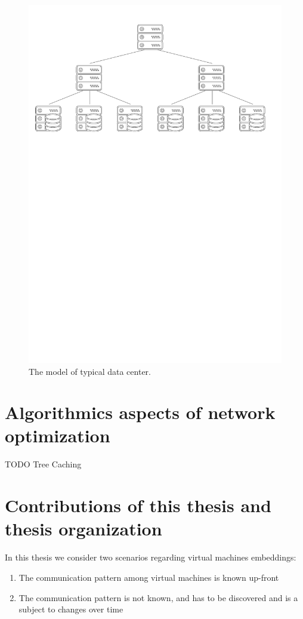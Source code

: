 \begin{figure}[t]
\centering
\includegraphics[width=0.79\columnwidth]{figs/tree-topology.pdf}
\caption{The model of typical data center.}\label{fig:overview}
\vspace{-1em}
\end{figure}

\section{Algorithmics aspects of network optimization}

TODO Tree Caching

\section{Contributions of this thesis and thesis organization}

In this thesis we consider two scenarios regarding virtual machines embeddings:
\begin{enumerate}
  \item The communication pattern among virtual machines is known up-front
  \item The communication pattern is not known, and has to be discovered and is a subject to changes over time
\end{enumerate}


